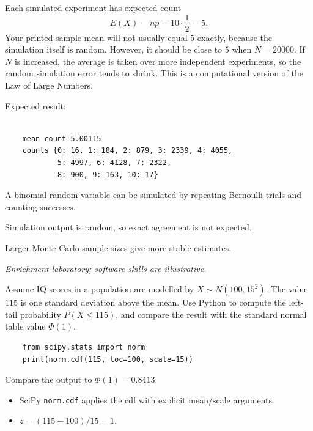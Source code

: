 \begin{solution}
Each simulated experiment has expected count
\[
E(X)=np=10\cdot\frac12=5.
\]
Your printed sample mean will not usually equal $5$ exactly, because the simulation itself is random. However, it should be close to $5$ when $N=20000$. If $N$ is increased, the average is taken over more independent experiments, so the random simulation error tends to shrink. This is a computational version of the Law of Large Numbers.


Expected result: 

\begin{verbatim}

    mean count 5.00115
    counts {0: 16, 1: 184, 2: 879, 3: 2339, 4: 4055, 
            5: 4997, 6: 4128, 7: 2322, 
            8: 900, 9: 163, 10: 17}

\end{verbatim}

\end{solution}

\begin{takeaways}
\item A binomial random variable can be simulated by repeating Bernoulli trials and counting successes.
\item Simulation output is random, so exact agreement is not expected.
\item Larger Monte Carlo sample sizes give more stable estimates.
\end{takeaways}

\begin{problem}
\textit{Enrichment laboratory; software skills are illustrative.}

Assume IQ scores in a population are modelled by $X\sim N(100,15^{2})$. The value $115$ is one standard deviation above the mean. Use Python to compute the left-tail probability $P(X\le115)$, and compare the result with the standard normal table value $\Phi(1)$.

\begin{verbatim}
    from scipy.stats import norm
    print(norm.cdf(115, loc=100, scale=15))
\end{verbatim}

Compare the output to $\Phi(1)=0{.}8413$.
\end{problem}

\begin{hint}
\begin{itemize}[leftmargin=*]
\item SciPy \texttt{norm.cdf} applies the cdf with explicit mean/scale arguments.
\item $z=(115-100)/15=1$.
\end{itemize}
\end{hint}

